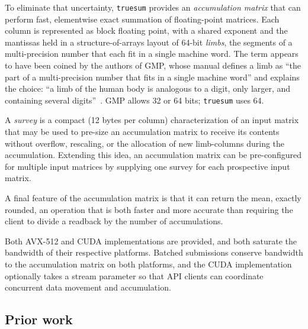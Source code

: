 \documentclass[acmsmall,screen,review]{acmart}
\newcommand{\code}[1]{\texttt{#1}}
\newcommand{\truesum}{\code{truesum}}
\begin{document}
To eliminate that uncertainty, \truesum{} provides an \emph{accumulation matrix} that can perform fast, elementwise exact summation of floating-point matrices. Each column is represented as block floating point, with a shared exponent and the mantissas held in a structure-of-arrays layout of 64-bit \emph{limbs}, the segments of a multi-precision number that each fit in a single machine word. The term appears to have been coined by the authors of GMP, whose manual defines a limb as ``the part of a multi-precision number that fits in a single machine word'' and explains the choice: ``a limb of the human body is analogous to a digit, only larger, and containing several digits''~\cite{gmp}. GMP allows 32 or 64 bits; \truesum{} uses 64.

A \emph{survey} is a compact (12 bytes per column) characterization of an input matrix that may be used to pre-size an accumulation matrix to receive its contents without overflow, rescaling, or the allocation of new limb-columns during the accumulation. Extending this idea, an accumulation matrix can be pre-configured for multiple input matrices by supplying one survey for each prospective input matrix.

A final feature of the accumulation matrix is that it can return the mean, exactly rounded, an operation that is both faster and more accurate than requiring the client to divide a readback by the number of accumulations.

Both AVX-512 and CUDA implementations are provided, and both saturate the bandwidth of their respective platforms. Batched submissions conserve bandwidth to the accumulation matrix on both platforms, and the CUDA implementation optionally takes a stream parameter so that API clients can coordinate concurrent data movement and accumulation.

\subsection{Prior work}
\end{document}
